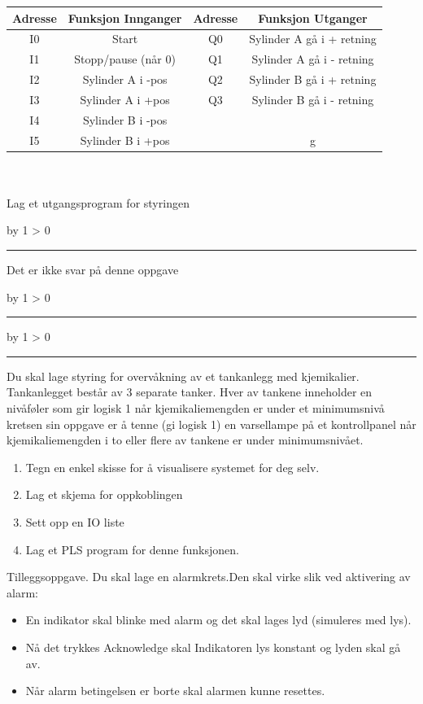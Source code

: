 \documentclass[12pt,a4paper]{article}
\def\oppgave{
            \advance\questnum by 1
            \ifnum \questnum > 0
                 \hrule
                 \vskip 3pt
                 \leftline{Oppgave \the\questnum}
                 \vskip 3pt \fi}
\def\svar{
           \advance\answnum by 1
           \ifnum \answnum > 0
                \hrule
                \vskip 3pt
                \leftline{Svar \the\answnum}
                \vskip 3pt \fi}
\def\notes{
           \advance\explnum by 1
           \ifnum \explnum > 0
                \hrule
                \vskip 3pt
                \leftline{Notes \the\explnum}
                \vskip 3pt \fi}
\begin{document}
\begin{tabular}{|c|c|c|c|}
\hline 
Adresse & Funksjon Innganger & Adresse & Funksjon Utganger\tabularnewline
\hline 
\hline 
I0 & Start & Q0 & Sylinder A gå i + retning\tabularnewline
\hline 
I1 & Stopp/pause (når 0) & Q1 & Sylinder A gå i - retning\tabularnewline
\hline 
I2 & Sylinder A i -pos & Q2 & Sylinder B gå i + retning\tabularnewline
\hline 
I3 & Sylinder A i +pos & Q3 & Sylinder B gå i - retning\tabularnewline
\hline 
I4 & Sylinder B i -pos &  & \tabularnewline
\hline 
I5 & Sylinder B i +pos &  & g\tabularnewline
\hline 
\end{tabular}
\\
\\
Lag et utgangsprogram for styringen
\vskip 10pt

\vskip 10pt \filbreak 





\svar{} 
Det er ikke svar på denne oppgave
\vskip 10pt \filbreak 





\notes{} 



\vfil \eject 





\oppgave{} 


Du skal lage styring for overvåkning av et
tankanlegg med kjemikalier. Tankanlegget består av 3 separate tanker.
Hver av tankene inneholder en nivåføler som gir logisk 1 når kjemikaliemengden
er under et minimumsnivå kretsen sin oppgave er å tenne (gi logisk
1) en varsellampe på et kontrollpanel når kjemikaliemengden i to eller
flere av tankene er under minimumsnivået.
\begin{enumerate}
\item Tegn en enkel skisse for å visualisere systemet for deg selv. 
\item Lag et skjema for oppkoblingen
\item Sett opp en IO liste
\item Lag et PLS program for denne funksjonen.
\end{enumerate}

Tilleggsoppgave. Du skal lage en alarmkrets.Den skal virke slik ved aktivering av alarm:
\begin{itemize}
\item En indikator skal blinke med alarm og det skal lages lyd (simuleres
med lys). 
\item Nå det trykkes Acknowledge skal Indikatoren lys konstant og lyden
skal gå av. 
\item Når alarm betingelsen er borte skal alarmen kunne resettes. 
\end{itemize}
\vskip 10pt
\vskip 10pt \filbreak 
\end{document}
